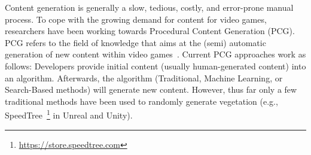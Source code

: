 

Content generation is generally a slow, tedious, costly, and error-prone manual process. To cope with the growing demand for content for video games, researchers have been working towards Procedural Content Generation (PCG). PCG refers to the field of knowledge that aims at the (semi) automatic generation of new content within video games~\cite{hendrikx2013procedural}. Current PCG approaches work as follows: Developers provide initial content (usually human-generated content) into an algorithm. Afterwards, the algorithm (Traditional, Machine Learning, or Search-Based methods) will generate new content. 
However, thus far only a few traditional methods have been used to randomly generate vegetation (e.g., SpeedTree~\footnote{\url{https://store.speedtree.com}} in Unreal and Unity).

